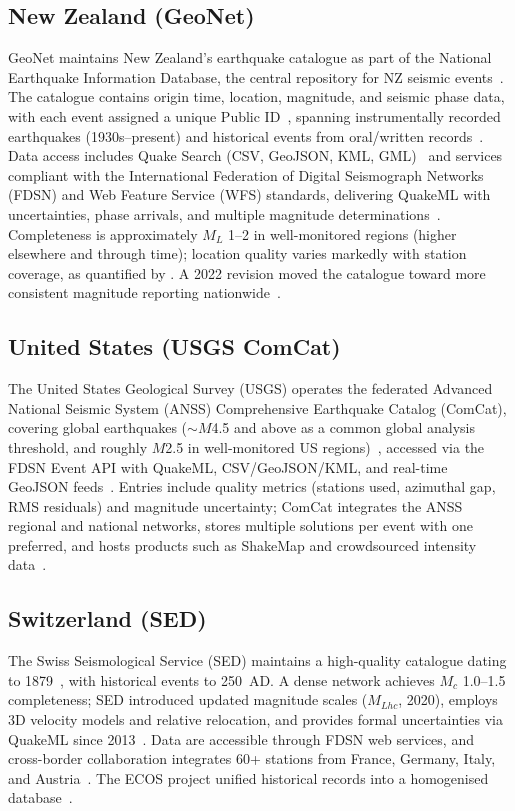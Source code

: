 \documentclass[11pt]{article}
\begin{document}
\subsection{New Zealand (GeoNet)}
GeoNet maintains New Zealand's earthquake catalogue as part of the National Earthquake Information Database, the central repository for NZ seismic events~\citep{gns_neid}. The catalogue contains origin time, location, magnitude, and seismic phase data, with each event assigned a unique Public ID~\citep{GeoNetEqCatalogue}, spanning instrumentally recorded earthquakes (1930s--present) and historical events from oral/written records~\citep{gns_neid}. Data access includes Quake Search (CSV, GeoJSON, KML, GML)~\citep{GeoNetEqCatalogue} and services compliant with the International Federation of Digital Seismograph Networks (FDSN) and Web Feature Service (WFS) standards, delivering QuakeML with uncertainties, phase arrivals, and multiple magnitude determinations~\citep{GeoNetFDSN,GeoNetLocationInfo}. Completeness is approximately $M_L$ 1--2 in well-monitored regions (higher elsewhere and through time); location quality varies markedly with station coverage, as quantified by \citet{WarrenSmith2025}. A 2022 revision moved the catalogue toward more consistent magnitude reporting nationwide~\citep{gns_neid}.

\subsection{United States (USGS ComCat)}
The United States Geological Survey (USGS) operates the federated Advanced National Seismic System (ANSS) Comprehensive Earthquake Catalog (ComCat), covering global earthquakes ($\sim$$M$4.5 and above as a common global analysis threshold, and roughly $M$2.5 in well-monitored US regions)~\citep{usgs_comcat}, accessed via the FDSN Event API with QuakeML, CSV/GeoJSON/KML, and real-time GeoJSON feeds~\citep{USGSFDSN}. Entries include quality metrics (stations used, azimuthal gap, RMS residuals) and magnitude uncertainty; ComCat integrates the ANSS regional and national networks, stores multiple solutions per event with one preferred, and hosts products such as ShakeMap and crowdsourced intensity data~\citep{usgs_comcat}.

\subsection{Switzerland (SED)}
The Swiss Seismological Service (SED) maintains a high-quality catalogue dating to 1879~\citep{sed_report}, with historical events to 250~AD. A dense network achieves $M_c$ 1.0--1.5 completeness; SED introduced updated magnitude scales ($M_{Lhc}$, 2020), employs 3D velocity models and relative relocation, and provides formal uncertainties via QuakeML since 2013~\citep{sed_report}. Data are accessible through FDSN web services, and cross-border collaboration integrates 60+ stations from France, Germany, Italy, and Austria~\citep{sed_report}. The ECOS project unified historical records into a homogenised database~\citep{ECOS09}.
\end{document}
